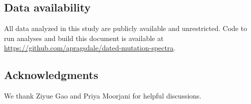 \documentclass[]{article}
\begin{document}
\subsection*{Data availability}

All data analyzed in this study are publicly available and unrestricted. Code
to run analyses and build this document is available at
\url{https://github.com/apragsdale/dated-mutation-spectra}.

\subsection*{Acknowledgments}

We thank Ziyue Gao and Priya Moorjani for helpful discussions.



\end{document}
